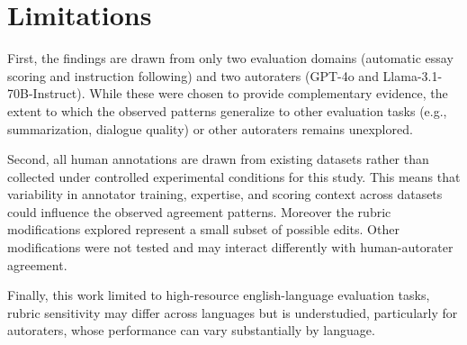 \section{Limitations}
First, the findings are drawn from only two evaluation domains (automatic essay scoring and instruction following) and two autoraters (GPT-4o and Llama-3.1-70B-Instruct). While these were chosen to provide complementary evidence, the extent to which the observed patterns generalize to other evaluation tasks (e.g., summarization, dialogue quality) or other autoraters remains unexplored.

Second, all human annotations are drawn from existing datasets rather than collected under controlled experimental conditions for this study. This means that variability in annotator training, expertise, and scoring context across datasets could influence the observed agreement patterns. Moreover the rubric modifications explored represent a small subset of possible edits. Other modifications were not tested and may interact differently with human-autorater agreement.
 
Finally, this work limited to high-resource english-language evaluation tasks, rubric sensitivity may differ across languages but is understudied, particularly for autoraters, whose performance can vary substantially by language.
